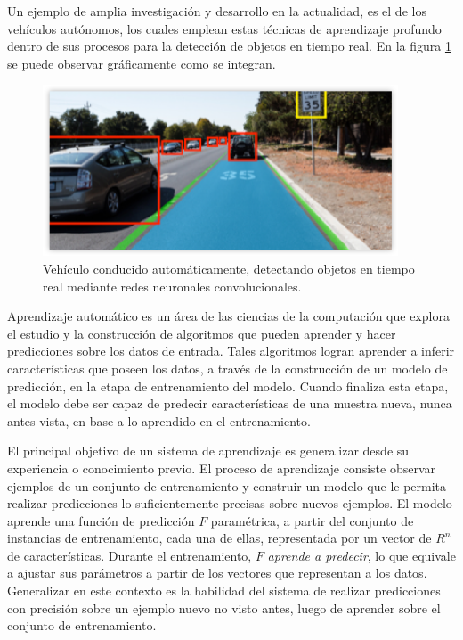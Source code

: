 \documentclass[a4paper,11pt,spanish]{book}
\begin{document}
    Un ejemplo de amplia investigación y desarrollo en la actualidad, es el de los vehículos autónomos,
    los cuales emplean estas técnicas de aprendizaje profundo dentro de sus procesos para la detección de objetos en tiempo real. 
    En la figura \ref{fig:car_detection} se puede observar gráficamente como se integran.

    \begin{figure}[h]
      \includegraphics[width=0.9\linewidth]{./img/nvidia_car_detection.png}
      \caption{Vehículo conducido automáticamente, detectando objetos en tiempo real mediante redes neuronales convolucionales.}
      \label{fig:car_detection}
    \end{figure}
    
    Aprendizaje automático es un área de las ciencias de la computación que explora el estudio y la construcción de algoritmos que pueden aprender y hacer 
    predicciones sobre los datos de entrada.
    Tales algoritmos logran aprender a inferir características que poseen los datos, a través de la construcción de un modelo de predicción, en la etapa de entrenamiento 
    del modelo.
    Cuando finaliza esta etapa, el modelo debe ser capaz de predecir características de una muestra nueva, nunca antes vista, en base a lo aprendido en el entrenamiento.

    El principal objetivo de un sistema de aprendizaje es generalizar desde su experiencia o conocimiento previo.
    El proceso de aprendizaje consiste observar ejemplos de un conjunto de entrenamiento y construir un modelo que le permita realizar predicciones lo suficientemente precisas 
    sobre nuevos ejemplos. 
    El modelo aprende una función de predicción $F$ paramétrica, a partir del conjunto de instancias de entrenamiento, cada una de ellas, 
    representada por un vector de $R^n$ de características.  
    Durante el entrenamiento, $F$  \emph{aprende a predecir}, lo que equivale a ajustar sus parámetros a partir de los vectores que representan a los datos.
    Generalizar en este contexto es la habilidad del sistema de realizar predicciones con precisión sobre un ejemplo nuevo no visto antes, 
    luego de aprender sobre el conjunto de entrenamiento. 
    
\end{document}
